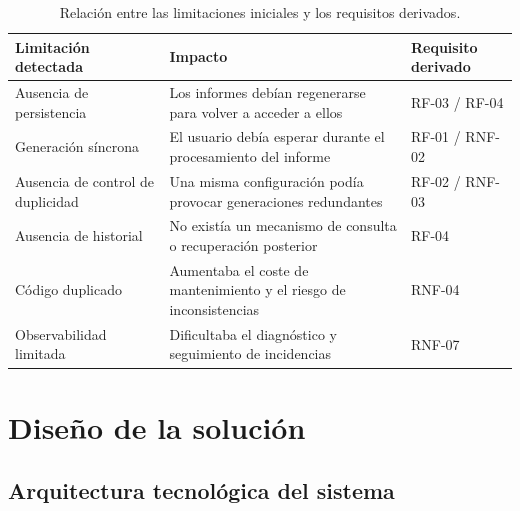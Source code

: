 \documentclass[11pt,a4paper,titlepage,oneside]{report}
\newcommand{\tfgtablestyle}{%
  \small
  \setlength{\tabcolsep}{4pt}%
  \renewcommand{\arraystretch}{1.15}%
  \rowcolors{2}{udcgray!08}{white}%
}
\begin{document}
\begin{table}[H]
  \centering
  \tfgtablestyle
  \caption{Relación entre las limitaciones iniciales y los requisitos derivados.}
  \label{tab:limitaciones-requisitos}

  \begin{tabularx}{0.97\textwidth}
    {@{}p{}X p{}@{}}

    \toprule
    \rowcolor{udcpink!20}

    \textbf{Limitación detectada} &
    \textbf{Impacto} &
    \textbf{Requisito derivado} \\

    \midrule

    Ausencia de persistencia &
    Los informes debían regenerarse para volver a acceder a ellos &
    RF-03 / RF-04 \\

    Generación síncrona &
    El usuario debía esperar durante el procesamiento del informe &
    RF-01 / RNF-02 \\

    Ausencia de control de duplicidad &
    Una misma configuración podía provocar generaciones redundantes &
    RF-02 / RNF-03 \\

    Ausencia de historial &
    No existía un mecanismo de consulta o recuperación posterior &
    RF-04 \\

    Código duplicado &
    Aumentaba el coste de mantenimiento y el riesgo de inconsistencias &
    RNF-04 \\

    Observabilidad limitada &
    Dificultaba el diagnóstico y seguimiento de incidencias &
    RNF-07 \\

    \bottomrule
  \end{tabularx}

\end{table}


\chapter{Diseño de la solución}
\label{chap:diseno}

\section{Arquitectura tecnológica del sistema}
\end{document}
